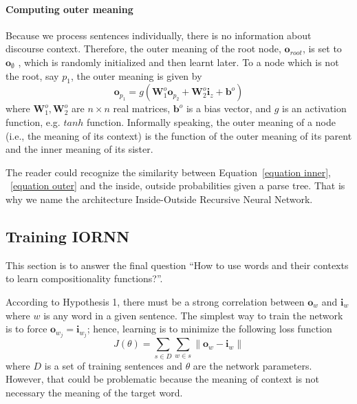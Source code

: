 \documentclass[11pt]{article}
\begin{document}
\paragraph{Computing outer meaning} Because we process sentences individually, there is no information 
about discourse context. Therefore, the outer meaning of the root node, $\mathbf{o}_{root}$, is set to $\mathbf{o}_{\emptyset}$
, which is randomly initialized and then learnt later. 
To a node which is not the root, say $p_1$, the outer meaning is given by
\begin{equation}
	\mathbf{o}_{p_1} = g(\mathbf{W}_1^o \mathbf{o}_{p_2} + \mathbf{W}_2^o \mathbf{i}_{z} + \mathbf{b}^o)
	\label{equation outer}
\end{equation}
where $\mathbf{W}_1^o, \mathbf{W}_2^o$ are $n \times n$ real matrices, 
$\mathbf{b}^o$ is a bias vector, and $g$ is an activation function, e.g. $tanh$ 
function. Informally speaking, the outer meaning of a node (i.e., the meaning of 
its context) is the function of the outer meaning of its parent and the inner meaning 
of its sister. 

The reader could recognize the similarity between 
Equation~\ref{equation inner}, ~\ref{equation outer}
and the inside, outside probabilities given a parse tree.
That is why we name the architecture Inside-Outside Recursive Neural Network.


\subsection{Training IORNN}
\label{subsection train iornn}

This section is to answer the final question ``How to use words and their contexts to 
learn compositionality functions?''. 

According to Hypothesis 1, there must be a strong correlation 
between $\mathbf{o}_{w}$ and $\mathbf{i}_{w}$ where $w$ is any word in 
a given sentence. The simplest way to train the network is to force 
$\mathbf{o}_{w_j} = \mathbf{i}_{w_j}$; hence, learning is to minimize the following 
loss function
\begin{equation}
	J(\theta) = \sum_{s \in D} \sum_{w \in s} \| \mathbf{o}_{w} - \mathbf{i}_{w} \|
\end{equation}
where $D$ is a set of training sentences and $\theta$ are the network parameters. 
However, that could be problematic because 
the meaning of context is not necessary the meaning of the target word.
\end{document}
